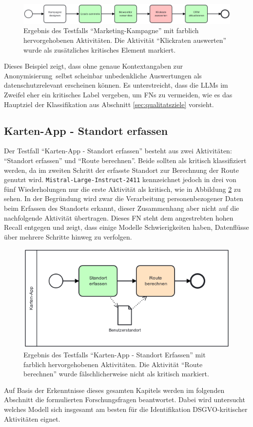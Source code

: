 \begin{figure}
    \centering
    \includegraphics[width=\textwidth]{images/results/examples/oss-20b-run-1-small-marketing}
    \caption{Ergebnis des Testfalls \enquote{Marketing-Kampagne} mit farblich hervorgehobenen Aktivitäten. Die Aktivität \enquote{Klickraten auswerten} wurde als zusätzliches kritisches Element markiert.}
    \label{fig:gptoss-fall}
\end{figure}

Dieses Beispiel zeigt, dass ohne genaue Kontextangaben zur Anonymisierung\linebreak~selbst scheinbar unbedenkliche Auswertungen als datenschutzrelevant erscheinen können. Es unterstreicht, dass die \acp{LLM} im Zweifel eher ein kritisches Label vergeben, um \acp{FN} zu vermeiden, wie es das Hauptziel der Klassifikation aus Abschnitt \ref{sec:qualitatsziele} vorsieht.

\subsection*{Karten-App - Standort erfassen}

Der Testfall \enquote{Karten-App - Standort erfassen} besteht aus zwei Aktivitäten: \enquote{Standort erfassen} und \enquote{Route berechnen}. Beide sollten als kritisch klassifiziert werden, da im zweiten Schritt der erfasste Standort zur Berechnung der Route genutzt wird. \texttt{Mistral-Large-Instruct-2411} kennzeichnet jedoch in drei von fünf Wiederholungen nur die erste Aktivität als kritisch, wie in Abbildung \ref{fig:mistral-fall} zu sehen. In der Begründung wird zwar die Verarbeitung personenbezogener Daten beim Erfassen des Standorts erkannt, dieser Zusammenhang aber nicht auf die nachfolgende Aktivität übertragen. Dieses \ac{FN} steht dem angestrebten hohen Recall entgegen und zeigt, dass einige Modelle Schwierigkeiten haben, Datenflüsse über mehrere Schritte hinweg zu verfolgen.

\begin{figure}
    \centering
    \includegraphics[width=.55\textwidth]{images/results/examples/mistral-large-run-3-small-maps-app}
    \caption{Ergebnis des Testfalls \enquote{Karten-App - Standort Erfassen} mit farblich hervorgehobenen Aktivitäten. Die Aktivität \enquote{Route berechnen} wurde fälschlicherweise nicht als kritisch markiert.}
    \label{fig:mistral-fall}
\end{figure}

Auf Basis der Erkenntnisse dieses gesamten Kapitels werden im folgenden Abschnitt die formulierten Forschungsfragen beantwortet. Dabei wird untersucht welches Modell sich insgesamt am besten für die Identifikation \ac{DSGVO}‑kritischer Aktivitäten eignet.